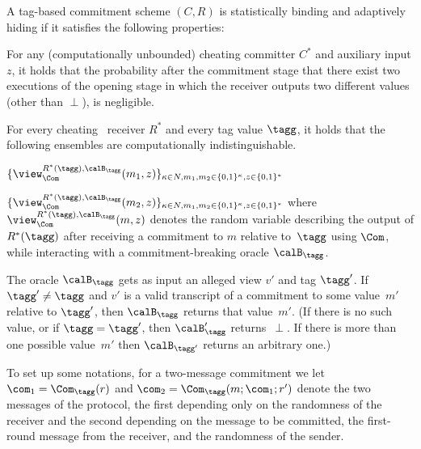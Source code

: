 \label{def:com}
A tag-based commitment scheme $(C,R)$ is statistically binding and adaptively hiding if it satisfies the following properties:
\begin{description}
\item[Statistical binding:] For any (computationally unbounded) cheating committer $C^*$ and auxiliary input $z$, it holds that the probability after the commitment stage that there exist two executions of the opening stage in which the receiver outputs two different values (other than $\perp$), is negligible.

\item[Adaptive hiding:] For every cheating \ppt\ receiver $R^*$ and every tag value $\tagg$, it holds that the following ensembles are computationally indistinguishable.
\BI
\item $\{\view_{\Com}^{R^*(\tagg),\calB_\tagg}(m_1,z)\}_{\kappa \in N,m_1, m_2 \in\{0,1\}^\kappa,z\in\{0,1\}^*}$

\item $\{\view_{\Com}^{R^*(\tagg),\calB_\tagg}(m_2,z)\}_{\kappa \in N,m_1, m_2 \in\{0,1\}^\kappa,z\in\{0,1\}^*}$
\EI
where $\view_{\Com}^{R^*(\tagg),\calB_\tagg}(m,z)$ denotes the random variable describing the output of $R^*(\tagg)$ after receiving a commitment to $m$ relative to~$\tagg$ using $\Com$, while interacting with a commitment-breaking oracle $\calB_\tagg$.

The oracle $\calB_\tagg$ gets as input an alleged view $v'$ and tag $\tagg'$. If $\tagg'\ne\tagg$ and $v'$ is a valid transcript of a commitment to some value~$m'$ relative to $\tagg'$, then $\calB_{\tagg}$ returns that value~$m'$. (If there is no such value, or if $\tagg=\tagg'$, then $\calB_\tagg'$ returns~$\perp$. If there is more than one possible value~$m'$ then $\calB_{\tagg'}$ returns an arbitrary one.)
\end{description}
\ED
To set up some notations, for a two-message commitment we let $\com_1=\Com_{\tagg}(r)$ and $\com_2=\Com_{\tagg}(m;\com_1 ;r')$ denote the two messages of the protocol, the first depending only on the randomness of the receiver and the second depending on the message to be committed, the first-round message from the receiver, and the randomness of the sender.

